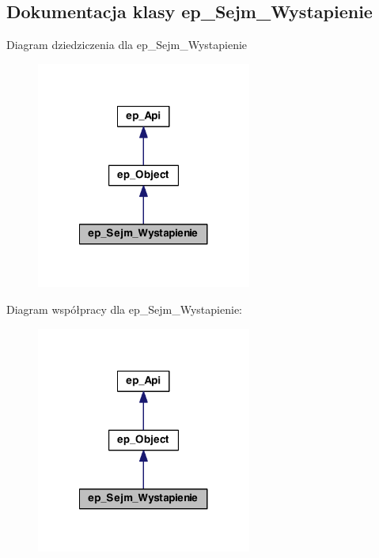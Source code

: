 \hypertarget{classep___sejm___wystapienie}{\subsection{Dokumentacja klasy ep\-\_\-\-Sejm\-\_\-\-Wystapienie}
\label{classep___sejm___wystapienie}
}


Diagram dziedziczenia dla ep\-\_\-\-Sejm\-\_\-\-Wystapienie\nopagebreak
\begin{figure}[H]
\begin{center}
\leavevmode
\includegraphics[width=200pt]{classep___sejm___wystapienie__inherit__graph}
\end{center}
\end{figure}


Diagram współpracy dla ep\-\_\-\-Sejm\-\_\-\-Wystapienie\-:\nopagebreak
\begin{figure}[H]
\begin{center}
\leavevmode
\includegraphics[width=200pt]{classep___sejm___wystapienie__coll__graph}
\end{center}
\end{figure}

